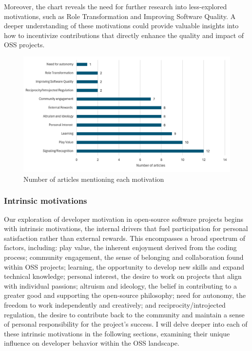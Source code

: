 Moreover, the chart reveals the need for further research into less-explored motivations, such as Role Transformation and Improving Software Quality. A deeper understanding of these motivations could provide valuable insights into how to incentivize contributions that directly enhance the quality and impact of OSS projects.

\begin{figure}[ht]
    \centering
    \includegraphics[width=1\linewidth]{figs/articleMotivationCount.png}
    \caption{Number of articles mentioning each motivation}
    \label{fig:articleMotivationCount}
\end{figure}

\subsubsection{Intrinsic motivations}
Our exploration of developer motivation in open-source software projects begins with intrinsic motivations, the internal drivers that fuel participation for personal satisfaction rather than external rewards. This encompasses a broad spectrum of factors, including: play value, the inherent enjoyment derived from the coding process; community engagement, the sense of belonging and collaboration found within OSS projects; learning, the opportunity to develop new skills and expand technical knowledge; personal interest, the desire to work on projects that align with individual passions; altruism and ideology, the belief in contributing to a greater good and supporting the open-source philosophy; need for autonomy, the freedom to work independently and creatively; and reciprocity/introjected regulation, the desire to contribute back to the community and maintain a sense of personal responsibility for the project's success. I will delve deeper into each of these intrinsic motivations in the following sections, examining their unique influence on developer behavior within the OSS landscape.

